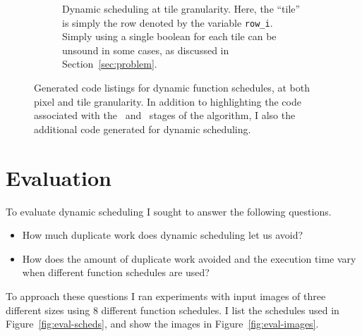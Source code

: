 \documentclass{article}
\begin{document}
\begin{figure}[h!]
\begin{center}
\begin{subfigure}[b]{0.475\textwidth}
\begin{center}
		\end{center}
		\caption{Dynamic scheduling at tile granularity. Here, the ``tile'' is simply the row denoted by the variable \texttt{row\_i}. Simply using a single boolean for each tile can be unsound in some cases, as discussed in Section~\ref{sec:problem}.}
		\label{fig:dynamic-tile}
	\end{subfigure}
	\end{center}
	\caption{Generated code listings for dynamic function schedules, at both pixel and tile granularity. In addition to highlighting the code associated with the ~and ~stages of the algorithm, I also {\bf {}} the additional code generated for dynamic scheduling.}
	\label{fig:dynamic}
\end{figure}

\pagebreak

\section{Evaluation}

To evaluate dynamic scheduling I sought to answer the following questions.

\begin{itemize}
	\item How much duplicate work does dynamic scheduling let us avoid?
	\item How does the amount of duplicate work avoided and the execution time vary when different function schedules are used?
\end{itemize}

To approach these questions I ran experiments with input images of three different sizes using 8 different function schedules. I list the schedules used in Figure~\ref{fig:eval-scheds}, and show the images in Figure~\ref{fig:eval-images}.
\end{document}
